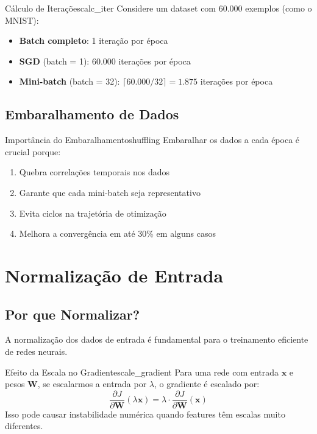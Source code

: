 \documentclass[a4paper,12pt]{article}
\newcommand{\grad}[2]{\frac{\partial #1}{\partial #2}}
\begin{document}
\begin{exemplo}{Cálculo de Iterações}{calc_iter}
Considere um dataset com 60.000 exemplos (como o MNIST):
\begin{itemize}
    \item \textbf{Batch completo}: 1 iteração por época
    \item \textbf{SGD} (batch = 1): 60.000 iterações por época
    \item \textbf{Mini-batch} (batch = 32): $\lceil 60.000/32 \rceil = 1.875$ iterações por época
\end{itemize}
\end{exemplo}

\subsection{Embaralhamento de Dados}

\begin{observacao}{Importância do Embaralhamento}{shuffling}
Embaralhar os dados a cada época é crucial porque:
\begin{enumerate}
    \item Quebra correlações temporais nos dados
    \item Garante que cada mini-batch seja representativo
    \item Evita ciclos na trajetória de otimização
    \item Melhora a convergência em até 30\% em alguns casos
\end{enumerate}
\end{observacao}

\section{Normalização de Entrada}

\subsection{Por que Normalizar?}

A normalização dos dados de entrada é fundamental para o treinamento eficiente de redes neurais.

\begin{teorema}{Efeito da Escala no Gradiente}{scale_gradient}
Para uma rede com entrada $\mathbf{x}$ e pesos $\mathbf{W}$, se escalarmos a entrada por $\lambda$, o gradiente é escalado por:
\[
\grad{J}{\mathbf{W}}(\lambda \mathbf{x}) = \lambda \cdot \grad{J}{\mathbf{W}}(\mathbf{x})
\]
Isso pode causar instabilidade numérica quando features têm escalas muito diferentes.
\end{teorema}
\end{document}
